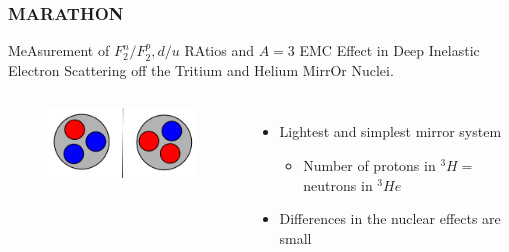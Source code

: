 \documentclass[12pt]{beamer}
\begin{document}
\begin{frame}
\frametitle{MARATHON}
\vspace{-10pt}
\begin{block}{}
MeAsurement of $F^n_2/F^p_2, d/u$ RAtios and $A=3$ EMC Effect in Deep Inelastic Electron Scattering off the Tritium and Helium MirrOr Nuclei.
\vspace{-10pt}
\begin{columns}[t]
	
	\vspace{-10pt}	
	\hspace{-10pt}
	\begin{figure}
		\includegraphics[width =5cm]{../images/mirror}
	\end{figure}
	
	\vspace{10pt}
	\begin{itemize}
		\item Lightest and simplest mirror system
		\begin{itemize}
			\item  Number of protons in $^3H =$ neutrons in $^3He$
		\end{itemize}
		\item Differences in the nuclear effects are small
	\end{itemize}
	
	
\end{columns}
\end{block}
\end{frame}

\end{document}
